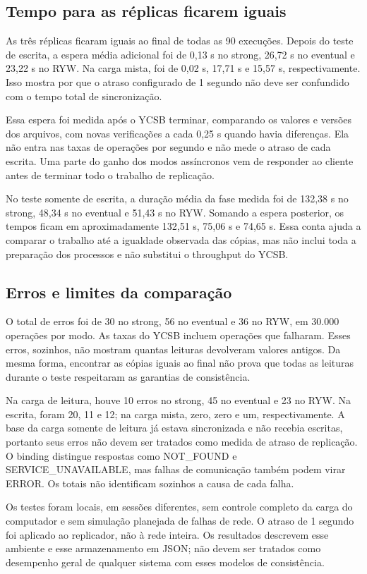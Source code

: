 \subsection{Tempo para as réplicas ficarem iguais}
As três réplicas ficaram iguais ao final de todas as 90 execuções.
Depois do teste de escrita, a espera média adicional foi de 0,13 s no strong,
26,72 s no eventual e 23,22 s no RYW. Na carga mista, foi de 0,02 s,
17,71 s e 15,57 s, respectivamente. Isso mostra por que o atraso configurado
de 1 segundo não deve ser confundido com o tempo total de sincronização.

Essa espera foi medida após o YCSB terminar, comparando os valores e versões
dos arquivos, com novas verificações a cada 0,25 s quando havia diferenças.
Ela não entra nas taxas de operações por segundo e não mede o atraso de cada
escrita. Uma parte do ganho dos modos assíncronos vem de responder ao cliente
antes de terminar todo o trabalho de replicação.

No teste somente de escrita, a duração média da fase medida foi de 132,38 s
no strong, 48,34 s no eventual e 51,43 s no RYW. Somando a espera posterior,
os tempos ficam em aproximadamente 132,51 s, 75,06 s e 74,65 s. Essa conta
ajuda a comparar o trabalho até a igualdade observada das cópias, mas não
inclui toda a preparação dos processos e não substitui o throughput do YCSB.

\subsection{Erros e limites da comparação}
O total de erros foi de 30 no strong, 56 no eventual e 36 no RYW, em
30.000 operações por modo. As taxas do YCSB incluem operações que falharam.
Esses erros, sozinhos, não mostram quantas leituras devolveram valores antigos.
Da mesma forma, encontrar as cópias iguais ao final não prova que todas as
leituras durante o teste respeitaram as garantias de consistência.

Na carga de leitura, houve 10 erros no strong, 45 no eventual e 23 no RYW.
Na escrita, foram 20, 11 e 12; na carga mista, zero, zero e um, respectivamente.
A base da carga somente de leitura já estava sincronizada e não recebia
escritas, portanto seus erros não devem ser tratados como medida de atraso
de replicação. O binding distingue respostas como NOT\_FOUND e
SERVICE\_UNAVAILABLE, mas falhas de comunicação também podem virar ERROR.
Os totais não identificam sozinhos a causa de cada falha.

Os testes foram locais, em sessões diferentes, sem controle completo da carga
do computador e sem simulação planejada de falhas de rede. O atraso de
1 segundo foi aplicado ao replicador, não à rede inteira. Os resultados
descrevem esse ambiente e esse armazenamento em JSON; não devem ser tratados
como desempenho geral de qualquer sistema com esses modelos de consistência.

